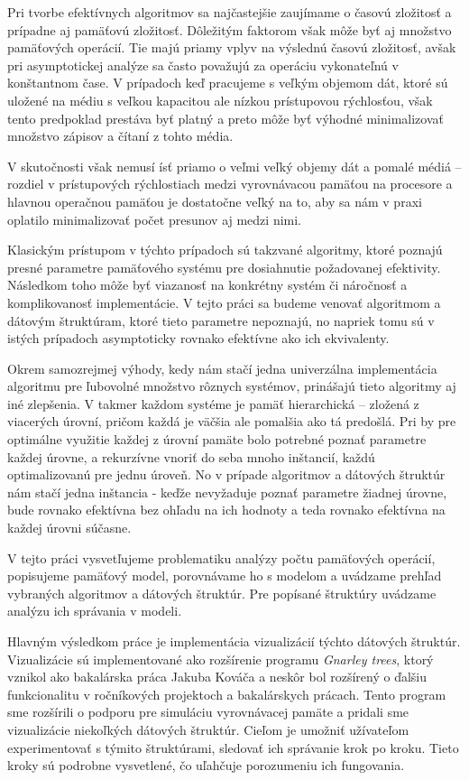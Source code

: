 
Pri tvorbe efektívnych algoritmov sa najčastejšie zaujímame o časovú zložitosť a prípadne aj pamäťovú zložitosť. Dôležitým faktorom však môže byť aj množstvo pamäťových operácií. Tie majú priamy vplyv na výslednú časovú zložitosť, avšak pri asymptotickej analýze sa často považujú za operáciu vykonateľnú v konštantnom čase. V prípadoch keď pracujeme s veľkým objemom dát, ktoré sú uložené na médiu s veľkou kapacitou ale nízkou prístupovou rýchlosťou, však tento predpoklad prestáva byť platný a preto môže byť výhodné minimalizovať množstvo zápisov a čítaní z tohto média. 

V skutočnosti však nemusí ísť priamo o veľmi veľký objemy dát a pomalé médiá -- rozdiel v prístupových rýchlostiach medzi vyrovnávacou pamäťou na procesore a hlavnou operačnou pamäťou je dostatočne veľký na to, aby sa nám v praxi oplatilo minimalizovať počet presunov aj medzi nimi.

Klasickým prístupom v týchto prípadoch sú takzvané \aware algoritmy, ktoré poznajú presné parametre pamäťového systému pre dosiahnutie požadovanej efektivity. Následkom toho môže byť viazanosť na konkrétny systém či náročnosť a komplikovanosť implementácie. V tejto práci sa budeme venovať \obliv algoritmom a dátovým štruktúram, ktoré tieto parametre nepoznajú, no napriek tomu sú v istých prípadoch asymptoticky rovnako efektívne ako ich \aware ekvivalenty.

Okrem samozrejmej výhody, kedy nám stačí jedna univerzálna implementácia algoritmu pre ľubovolné množstvo rôznych systémov, prinášajú tieto algoritmy aj iné zlepšenia. V takmer každom systéme je pamäť hierarchická -- zložená z viacerých úrovní, pričom každá je väčšia ale pomalšia ako tá predošlá. Pri \aware by pre optimálne využitie každej z úrovní pamäte bolo potrebné poznať parametre každej úrovne, a rekurzívne vnoriť do seba mnoho inštancií, každú optimalizovanú pre jednu úroveň. No v prípade \obliv algoritmov a dátových štruktúr nám stačí jedna inštancia - keďže nevyžaduje poznať parametre žiadnej úrovne, bude rovnako efektívna bez ohľadu na ich hodnoty a teda rovnako efektívna na každej úrovni súčasne.

V tejto práci vysvetľujeme problematiku analýzy počtu pamäťových operácií, popisujeme \obliv pamäťový model, porovnávame ho s \aware modelom a uvádzame prehľad vybraných algoritmov a dátových štruktúr. Pre popísané štruktúry uvádzame analýzu ich správania v \obliv modeli.

Hlavným výsledkom práce je implementácia vizualizácií týchto dátových štruktúr. Vizualizácie sú implementované ako rozšírenie programu {\em Gnarley trees}, ktorý vznikol ako bakalárska práca Jakuba Kováča a neskôr bol rozšírený o ďalšiu funkcionalitu v ročníkových projektoch a bakalárskych prácach. Tento program sme rozšírili o podporu pre simuláciu vyrovnávacej pamäte a pridali sme vizualizácie niekoľkých \obliv dátových štruktúr. Cieľom je umožniť užívateľom experimentovať s týmito štruktúrami, sledovať ich správanie krok po kroku. Tieto kroky sú podrobne vysvetlené, čo uľahčuje porozumeniu ich fungovania. 